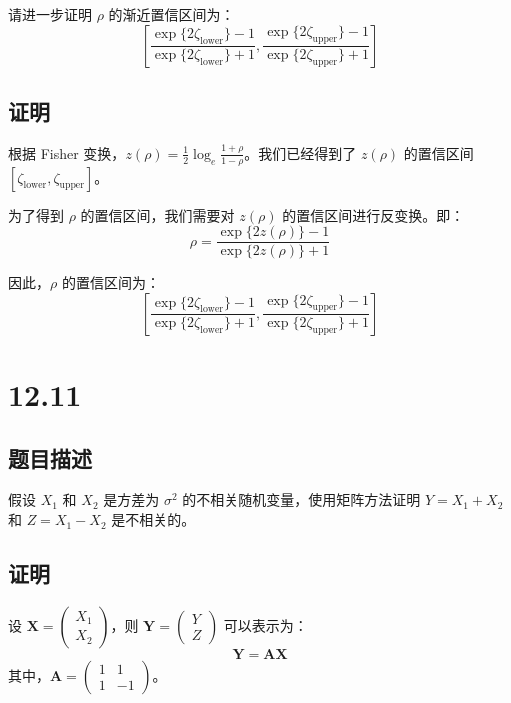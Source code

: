 \documentclass[UTF8]{article}
\theoremstyle{MyLineTheoremStyle} %
\theoremstyle{MyBlockTheoremStyle} %
\theoremstyle{MySubsubsectionStyle} %
\begin{document}
请进一步证明 $\rho$ 的渐近置信区间为：
\[
\left[ \frac{\exp\{2 \zeta_{\text{lower}}\} - 1}{\exp\{2 \zeta_{\text{lower}}\} + 1}, \frac{\exp\{2 \zeta_{\text{upper}}\} - 1}{\exp\{2 \zeta_{\text{upper}}\} + 1} \right]
\]

\subsection*{证明}


根据 Fisher 变换，$z(\rho) = \frac{1}{2} \log_e \frac{1+\rho}{1-\rho}$。我们已经得到了 $z(\rho)$ 的置信区间 $[\zeta_{\text{lower}}, \zeta_{\text{upper}}]$。

为了得到 $\rho$ 的置信区间，我们需要对 $z(\rho)$ 的置信区间进行反变换。即：
\[
\rho = \frac{\exp\{2 z(\rho)\} - 1}{\exp\{2 z(\rho)\} + 1}
\]

因此，$\rho$ 的置信区间为：
\[
\left[ \frac{\exp\{2 \zeta_{\text{lower}}\} - 1}{\exp\{2 \zeta_{\text{lower}}\} + 1}, \frac{\exp\{2 \zeta_{\text{upper}}\} - 1}{\exp\{2 \zeta_{\text{upper}}\} + 1} \right]
\]



\cleardoublepage


\section{12.11}

\subsection*{题目描述}

假设 $X_1$ 和 $X_2$ 是方差为 $\sigma^2$ 的不相关随机变量，使用矩阵方法证明 $Y = X_1 + X_2$ 和 $Z = X_1 - X_2$ 是不相关的。

\subsection*{证明}

设 $\mathbf{X} = \begin{pmatrix} X_1 \\ X_2 \end{pmatrix}$，则 $\mathbf{Y} = \begin{pmatrix} Y \\ Z \end{pmatrix}$ 可以表示为：
\[
\mathbf{Y} = \mathbf{A} \mathbf{X}
\]
其中，$\mathbf{A} = \begin{pmatrix} 1 & 1 \\ 1 & -1 \end{pmatrix}$。
\end{document}
